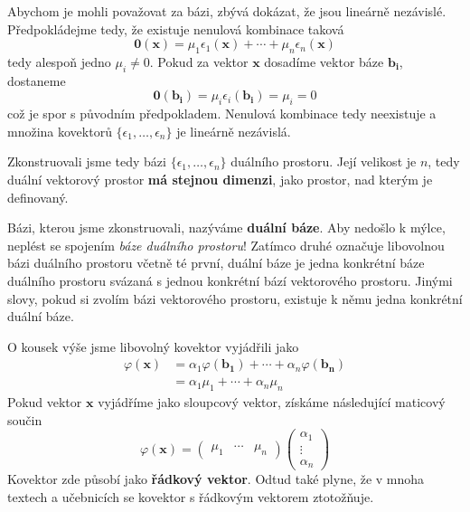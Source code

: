 \documentclass[a5paper,12pt]{amsbook}
\theoremstyle{definition}
\newcommand{\myscalar}[1]{#1}
\newcommand{\myvec}[1]{\bm{#1}}
\newcommand{\mymap}[1]{#1}
\begin{document}
Abychom je mohli považovat za bázi, zbývá dokázat, že jsou lineárně nezávislé. Předpokládejme tedy,
že existuje nenulová kombinace taková
\begin{equation*}
\myvec{0}(\myvec{x}) = \myscalar{\mu_1}\mymap{\epsilon_1}(\myvec{x}) + \cdots 
  + \myscalar{\mu_n}\mymap{\epsilon_n}(\myvec{x})
\end{equation*}
tedy alespoň jedno $\myscalar{\mu_i} \neq 0$. Pokud za vektor $\myvec{x}$ dosadíme vektor báze
$\myvec{b_i}$, dostaneme
\begin{equation*}
\myvec{0}(\myvec{b_i}) = \myscalar{\mu_i}\mymap{\epsilon_i}(\myvec{b_i}) = \myscalar{\mu_i} = 0
\end{equation*}
což je spor s původním předpokladem. Nenulová kombinace tedy neexistuje a množina kovektorů
$\{\mymap{\epsilon_1}, \ldots, \mymap{\epsilon_n}\}$ je lineárně nezávislá.

Zkonstruovali jsme tedy bázi $\{\mymap{\epsilon_1}, \ldots, \mymap{\epsilon_n}\}$ duálního prostoru.
Její velikost je $n$, tedy duální vektorový prostor \textbf{má stejnou dimenzi}, jako prostor, nad
kterým je definovaný.

Bázi, kterou jsme zkonstruovali, nazýváme \textbf{duální báze}. Aby nedošlo k mýlce, neplést se
spojením \textit{báze duálního prostoru}! Zatímco druhé označuje libovolnou bázi duálního
prostoru včetně té první, duální báze je jedna konkrétní báze duálního prostoru svázaná s
jednou konkrétní bází vektorového prostoru. Jinými slovy, pokud si zvolím bázi vektorového
prostoru, existuje k němu jedna konkrétní duální báze.

O kousek výše jsme libovolný kovektor vyjádřili jako
\begin{equation*}
\begin{split}
\mymap{\varphi}(\myvec{x}) &= \myscalar{\alpha_1}\mymap{\varphi}(\myvec{b_1}) + \cdots
  + \myscalar{\alpha_n}\mymap{\varphi}(\myvec{b_n}) \\
&= \myscalar{\alpha_1}\myscalar{\mu_1} + \cdots + \myscalar{\alpha_n}\myscalar{\mu_n}
\end{split}
\end{equation*}
Pokud vektor $\myvec{x}$ vyjádříme jako sloupcový vektor, získáme následující maticový součin
\begin{equation*}
\mymap{\varphi}(\myvec{x}) = \left(\begin{array}{ccc}
\myscalar{\mu_1} & \cdots & \myscalar{\mu_n}
\end{array}\right)\left(\begin{array}{c}
\myscalar{\alpha_1}\\
\vdots\\
\myscalar{\alpha_n}
\end{array}\right)
\end{equation*}
Kovektor zde působí jako \textbf{řádkový vektor}. Odtud také plyne, že v mnoha textech a učebnicích
se kovektor s řádkovým vektorem ztotožňuje.
\end{document}
